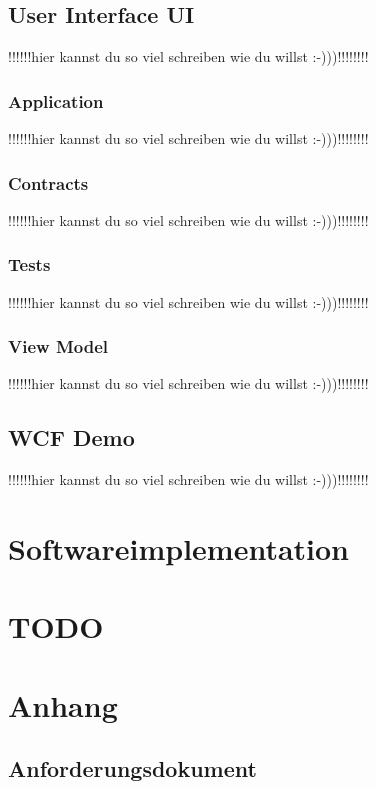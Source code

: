 \documentclass[12pt,a4paper,bibliography=totocnumbered,listof=totocnumbered]{scrartcl}
\begin{document}
\subsection{User Interface UI}
!!!!!!hier kannst du so viel schreiben wie du willst :-)))!!!!!!!!
\subsubsection{Application}
!!!!!!hier kannst du so viel schreiben wie du willst :-)))!!!!!!!!
\subsubsection{Contracts}
!!!!!!hier kannst du so viel schreiben wie du willst :-)))!!!!!!!!
\subsubsection{Tests}
!!!!!!hier kannst du so viel schreiben wie du willst :-)))!!!!!!!!
\subsubsection{View Model}
!!!!!!hier kannst du so viel schreiben wie du willst :-)))!!!!!!!!


\subsection{WCF Demo}
!!!!!!hier kannst du so viel schreiben wie du willst :-)))!!!!!!!!

\newpage
\section{Softwareimplementation}
\sloppy

\newpage
\section{TODO}

\section{Anhang}
\subsection{Anforderungsdokument}  \label{Anforderungsdokument}

\sloppy
\end{document}
